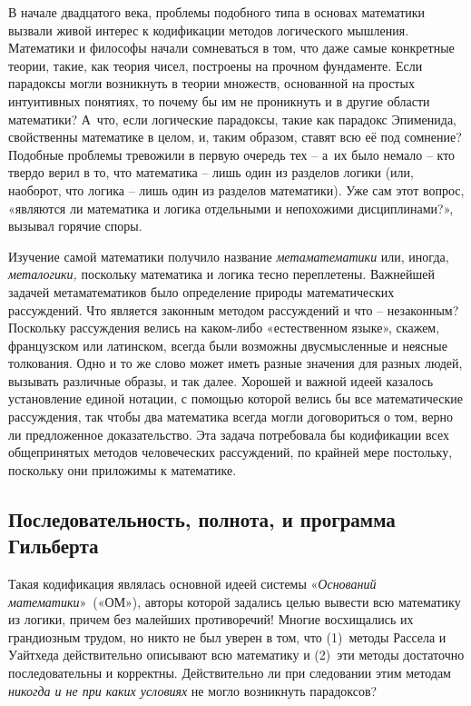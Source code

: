 \documentclass[../main.tex]{subfiles}
\begin{document}
В начале двадцатого века, проблемы подобного типа в основах математики вызвали живой интерес к кодификации методов логического мышления. Математики и философы начали сомневаться в том, что даже самые конкретные теории, такие, как теория чисел, построены на прочном фундаменте. Если парадоксы могли возникнуть в теории множеств, основанной на простых интуитивных понятиях, то почему бы им не проникнуть и в другие области математики? А~что, если логические парадоксы, такие как парадокс Эпименида, свойственны математике в целом, и, таким образом, ставят всю её под сомнение? Подобные проблемы тревожили в первую очередь тех \--- а~их было немало \--- кто твердо верил в то, что математика \--- лишь один из разделов логики (или, наоборот, что логика \--- лишь один из разделов математики). Уже сам этот вопрос, «являются ли математика и логика отдельными и непохожими дисциплинами?», вызывал горячие споры.

Изучение самой математики получило название \emph{метаматематики} или, иногда, \emph{металогики,} поскольку математика и логика тесно переплетены. Важнейшей задачей метаматематиков было определение природы математических рассуждений. Что является законным методом рассуждений и что \--- незаконным? Поскольку рассуждения велись на каком-либо «естественном языке», скажем, французском или латинском, всегда были возможны двусмысленные и неясные толкования. Одно и то же слово может иметь разные значения для разных людей, вызывать различные образы, и так далее. Хорошей и важной идеей казалось установление единой нотации, с помощью которой велись бы все математические рассуждения, так чтобы два математика всегда могли договориться о том, верно ли предложенное доказательство. Эта задача потребовала бы кодификации всех общепринятых методов человеческих рассуждений, по крайней мере постольку, поскольку они приложимы к математике.


\subsection{Последовательность, полнота, и программа Гильберта}

Такая кодификация являлась основной идеей системы «\emph{Оснований математики}»~(«ОМ»), авторы которой задались целью вывести всю математику из логики, причем без малейших противоречий! Многие восхищались их грандиозным трудом, но никто не был уверен в том, что (1)~методы Рассела и Уайтхеда действительно описывают всю математику и (2)~эти методы достаточно последовательны и корректны. Действительно ли при следовании этим методам \emph{никогда и не при каких условиях} не могло возникнуть парадоксов?
\end{document}
